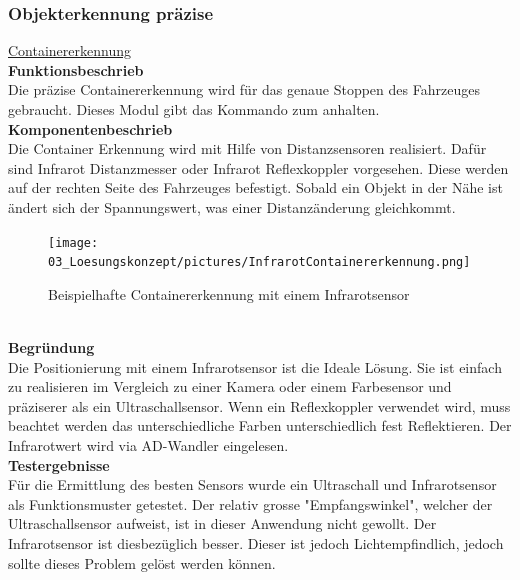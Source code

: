 \subsubsection{Objekterkennung präzise}


\underline{Containererkennung}\\[0.2cm]
\textbf{Funktionsbeschrieb}\\[0.2cm]
Die präzise Containererkennung wird für das genaue Stoppen des Fahrzeuges gebraucht. Dieses Modul gibt das Kommando zum anhalten.\\[0.2cm]
\textbf{Komponentenbeschrieb}\\[0.2cm]
Die Container Erkennung wird mit Hilfe von Distanzsensoren realisiert. Dafür sind Infrarot Distanzmesser oder Infrarot Reflexkoppler vorgesehen. Diese werden auf der rechten Seite des Fahrzeuges befestigt. Sobald ein Objekt in der Nähe ist ändert sich der Spannungswert, was einer Distanzänderung gleichkommt. 
\begin{figure} [h]
	\centering
	\texttt{[image: 03\_Loesungskonzept/pictures/InfrarotContainererkennung.png]}
	\caption{Beispielhafte Containererkennung mit einem Infrarotsensor}
\end{figure}\\[0.2cm]
\textbf{Begründung}\\[0.2cm]
Die Positionierung mit einem Infrarotsensor ist die Ideale Lösung. Sie ist einfach zu realisieren im Vergleich zu einer Kamera oder einem Farbesensor und präziserer als ein Ultraschallsensor. Wenn ein Reflexkoppler verwendet wird, muss beachtet werden das unterschiedliche Farben unterschiedlich fest Reflektieren. Der Infrarotwert wird via AD-Wandler eingelesen.\\[0.2cm]
\textbf{Testergebnisse}\\[0.2cm]
Für die Ermittlung des besten Sensors wurde ein Ultraschall und Infrarotsensor als Funktionsmuster getestet. Der relativ grosse "Empfangswinkel", welcher der Ultraschallsensor aufweist, ist in dieser Anwendung nicht gewollt. Der Infrarotsensor ist diesbezüglich besser. Dieser ist jedoch Lichtempfindlich, jedoch sollte dieses Problem gelöst werden können.\\[0.2cm]
